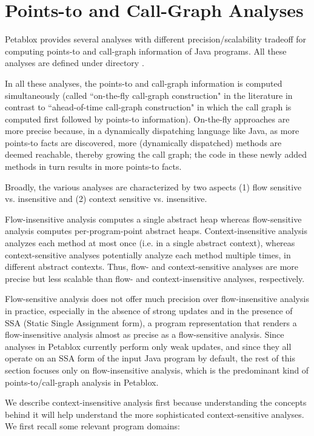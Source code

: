 \section{Points-to and Call-Graph Analyses}

Petablox provides several analyses with different precision/scalability tradeoff for
computing points-to and call-graph information of Java programs.  All these
analyses are defined under directory .

In all these analyses, the points-to and call-graph information is computed
simultaneously (called ``on-the-fly call-graph construction" in the literature
in contrast to ``ahead-of-time call-graph construction" in which the call graph
is computed first followed by points-to information).  On-the-fly approaches are
more precise because, in a dynamically dispatching language like Java, as more
points-to facts are discovered, more (dynamically dispatched) methods are deemed
reachable, thereby growing the call graph; the code in these newly added methods
in turn results in more points-to facts.

Broadly, the various analyses are characterized by two aspects (1) flow
sensitive vs. insensitive and (2) context sensitive vs. insensitive.

Flow-insensitive analysis computes a single abstract heap whereas flow-sensitive
analysis computes per-program-point abstract heaps.  Context-insensitive
analysis analyzes each method at most once (i.e. in a single abstract context),
whereas context-sensitive analyses potentially analyze each method multiple
times, in different abstract contexts.  Thus, flow- and context-sensitive
analyses are more precise but less scalable than flow- and context-insensitive
analyses, respectively.

Flow-sensitive analysis does not offer much precision over flow-insensitive
analysis in practice, especially in the absence of strong updates and in the
presence of SSA (Static Single Assignment form), a program representation that
renders a flow-insensitive analysis almost as precise as a flow-sensitive
analysis.  Since analyses in Petablox currently perform only weak updates, and
since they all operate on an SSA form of the input Java program by default, the
rest of this section focuses only on flow-insensitive analysis, which is the
predominant kind of points-to/call-graph analysis in Petablox.

We describe context-insensitive analysis first because understanding the
concepts behind it will help understand the more sophisticated context-sensitive
analyses.  We first recall some relevant program domains:

